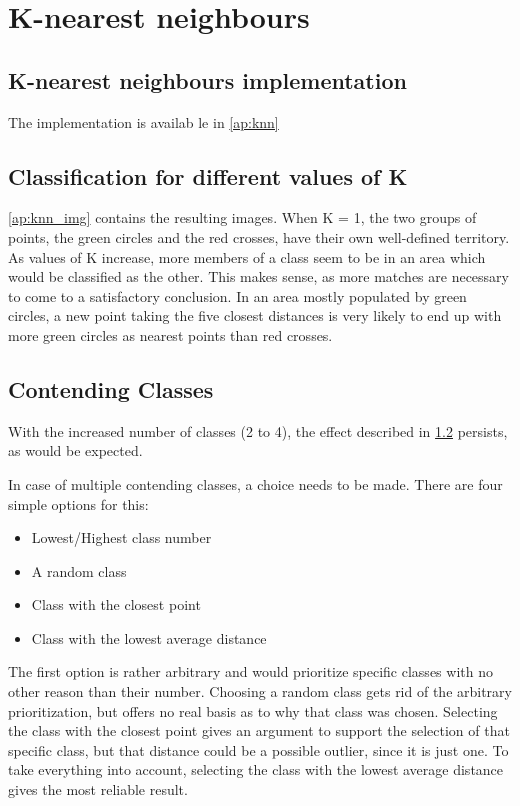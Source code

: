 \documentclass[10pt,a4paper]{article}
\begin{document}
\section{K-nearest neighbours}
\subsection{K-nearest neighbours implementation}
The implementation is availab le in \ref{ap:knn}

\subsection{Classification for different values of K} \label{ss:class}
\ref{ap:knn_img} contains the resulting images. When K = 1, the two groups of points, the green circles and the red crosses, have their own well-defined territory. As values of K increase, more members of a class seem to be in an area which would be classified as the other. This makes sense, as more matches are necessary to come to a satisfactory conclusion. In an area mostly populated by green circles, a new point taking the five closest distances is very likely to end up with more green circles as nearest points than red crosses.

\subsection{Contending Classes}
With the increased number of classes (2 to 4), the effect described in \ref{ss:class} persists, as would be expected.

In case of multiple contending classes, a choice needs to be made. There are four simple options for this:
\begin{itemize}
\item Lowest/Highest class number
\item A random class
\item Class with the closest point
\item Class with the lowest average distance
\end{itemize}

The first option is rather arbitrary and would prioritize specific classes with no other reason than their number. Choosing a random class gets rid of the arbitrary prioritization, but offers no real basis as to why that class was chosen.
Selecting the class with the closest point gives an argument to support the selection of that specific class, but that distance could be a possible outlier, since it is just one. To take everything into account, selecting the class with the lowest average distance gives the most reliable result.
\end{document}

